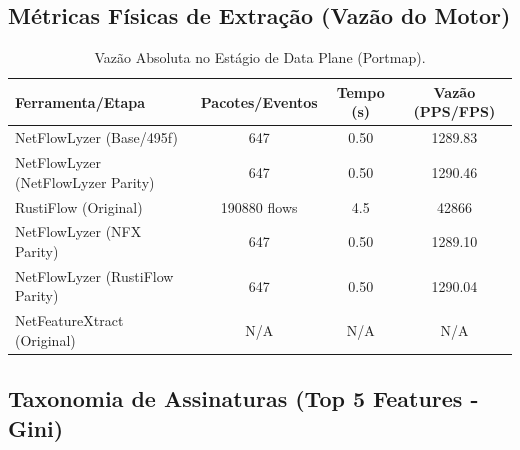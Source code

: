 \documentclass[11pt,a4paper]{article}
\begin{document}
\subsection{Métricas Físicas de Extração (Vazão do Motor)}
\begin{table}[H]
\centering
\begin{threeparttable}
\begin{tabular}{lccc}
\toprule
\textbf{Ferramenta/Etapa} & \textbf{Pacotes/Eventos} & \textbf{Tempo (s)} & \textbf{Vazão (PPS/FPS)} \\
\midrule
NetFlowLyzer (Base/495f) & 647 & 0.50 & 1289.83 \\
NetFlowLyzer (NetFlowLyzer Parity) & 647 & 0.50 & 1290.46 \\
RustiFlow (Original) & 190880 flows & 4.5 & 42866 \\
NetFlowLyzer (NFX Parity) & 647 & 0.50 & 1289.10 \\
NetFlowLyzer (RustiFlow Parity) & 647 & 0.50 & 1290.04 \\
NetFeatureXtract (Original) & N/A & N/A & N/A \\
\bottomrule
\end{tabular}
\end{threeparttable}
\caption{Vazão Absoluta no Estágio de Data Plane (Portmap).}
\end{table}

\subsection{Taxonomia de Assinaturas (Top 5 Features - Gini)}
\begin{table}[H]
\centering
{}
\caption{Principais atributos de correlação estocástica por limiar dimensional (Portmap).}
\end{table}
\end{document}
